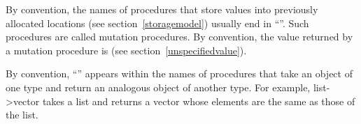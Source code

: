 By convention, the names of procedures that store values into previously
allocated locations (see section~\ref{storagemodel}) usually end in
``\ide{!}''.
Such procedures are called mutation procedures.
By convention, the value returned by a mutation procedure is
\unspecifiedreturn (see section~\ref{unspecifiedvalue}).

By convention, ``\ide{->}'' appears within the names of procedures that
take an object of one type and return an analogous object of another type.
For example, {\cf list->vector} takes a list and returns a vector whose
elements are the same as those of the list.


	

